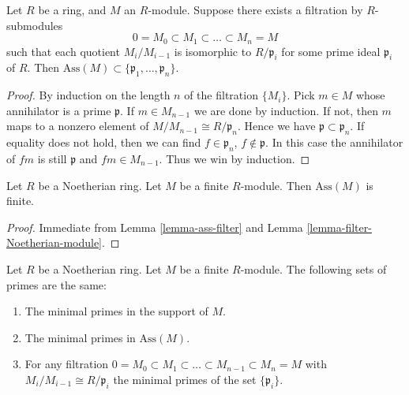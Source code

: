 \begin{lemma}
\label{lemma-ass-filter}
Let $R$ be a ring, and $M$ an $R$-module.
Suppose there exists a filtration by $R$-submodules
$$
0 = M_0 \subset M_1 \subset \ldots \subset M_n = M
$$
such that each quotient $M_i/M_{i-1}$ is isomorphic to $R/\mathfrak p_i$
for some prime ideal $\mathfrak p_i$ of $R$.
Then $\text{Ass}(M) \subset \{\mathfrak p_1, \ldots, \mathfrak p_n\}$.
\end{lemma}

\begin{proof}
By induction on the length $n$ of the filtration $\{ M_i \}$.
Pick $m \in M$ whose annihilator is a prime $\mathfrak p$.
If $m \in M_{n-1}$ we are done by induction. If not,
then $m$ maps to a nonzero element of $M/M_{n-1} \cong
R/\mathfrak p_n$. Hence we have $\mathfrak p \subset \mathfrak p_n$.
If equality does not hold, then we can find $f \in \mathfrak p_n$,
$f \not\in \mathfrak p$. In this case the annihilator of $fm$ is still
$\mathfrak p$ and $fm \in M_{n-1}$. Thus we win by induction.
\end{proof}

\begin{lemma}
\label{lemma-finite-ass}
Let $R$ be a Noetherian ring.
Let $M$ be a finite $R$-module.
Then $\text{Ass}(M)$ is finite.
\end{lemma}

\begin{proof}
Immediate from Lemma \ref{lemma-ass-filter} and
Lemma \ref{lemma-filter-Noetherian-module}.
\end{proof}

\begin{proposition}
\label{proposition-minimal-primes-associated-primes}
Let $R$ be a Noetherian ring.
Let $M$ be a finite $R$-module.
The following sets of primes are the same:
\begin{enumerate}
\item The minimal primes in the support of $M$.
\item The minimal primes in $\text{Ass}(M)$.
\item For any filtration $0 = M_0 \subset M_1 \subset \ldots
\subset M_{n-1} \subset M_n = M$ with $M_i/M_{i-1} \cong R/\mathfrak p_i$
the minimal primes of the set $\{\mathfrak p_i\}$.
\end{enumerate}
\end{proposition}

